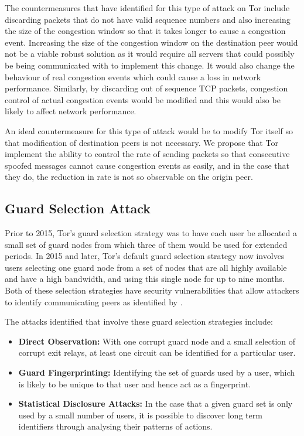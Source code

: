 \documentclass[9pt,technote]{IEEEtran}
\begin{document}
The countermeasures that \citeauthor{gilad2012spying} have identified for this type of attack on Tor include discarding packets that do not have valid sequence numbers and also increasing the size of the congestion window so that it takes longer to cause a congestion event. Increasing the size of the congestion window on the destination peer would not be a viable robust solution as it would require all servers that could possibly be being communicated with to implement this change. It would also change the behaviour of real congestion events which could cause a loss in network performance. Similarly, by discarding out of sequence TCP packets, congestion control of actual congestion events would be modified and this would also be likely to affect network performance. 

An ideal countermeasure for this type of attack would be to modify Tor itself so that modification of destination peers is not necessary. We propose that Tor implement the ability to control the rate of sending packets so that consecutive spoofed messages cannot cause congestion events as easily, and in the case that they do, the reduction in rate is not so observable on the origin peer.

\subsection{Guard Selection Attack}
Prior to 2015, Tor's guard selection strategy was to have each user be allocated a small set of guard nodes from which three of them would be used for extended periods. In 2015 and later, Tor's default guard selection strategy now involves users selecting one guard node from a set of nodes that are all highly available and have a high bandwidth, and using this single node for up to nine months. Both of these selection strategies have security vulnerabilities that allow attackers to identify communicating peers as identified by \citeauthor{hayesguard}.

The attacks identified that involve these guard selection strategies include:
\begin{itemize}
\item \textbf{Direct Observation:} With one corrupt guard node and a small selection of corrupt exit relays, at least one circuit can be identified for a particular user.
\item \textbf{Guard Fingerprinting:} Identifying the set of guards used by a user, which is likely to be unique to that user and hence act as a fingerprint.
\item \textbf{Statistical Disclosure Attacks:} In the case that a given guard set is only used by a small number of users, it is possible to discover long term identifiers through analysing their patterns of actions.
\end{itemize}
\end{document}
